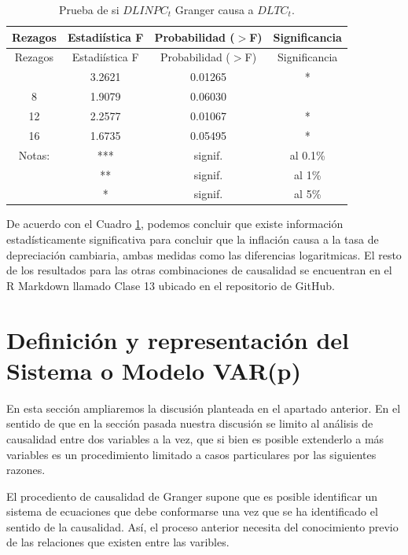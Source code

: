 \documentclass[
]{book}
\begin{document}
\begin{longtable}[]{@{}cccc@{}}
\caption{\label{tab:Granger} Prueba de si \(DLINPC_t\) Granger causa a \(DLTC_t\).}\tabularnewline
\toprule\noalign{}
Rezagos & Estadiística F & Probabilidad (\(>\)F) & Significancia \\
\midrule\noalign{}
\endfirsthead
\toprule\noalign{}
Rezagos & Estadiística F & Probabilidad (\(>\)F) & Significancia \\
\midrule\noalign{}
\endhead
\bottomrule\noalign{}
\endlastfoot
4 & 3.2621 & 0.01265 & * \\
8 & 1.9079 & 0.06030 & \\
12 & 2.2577 & 0.01067 & * \\
16 & 1.6735 & 0.05495 & * \\
Notas: & *** & signif. & al 0.1\% \\
& ** & signif. & al 1\% \\
& * & signif. & al 5\% \\
\end{longtable}

De acuerdo con el Cuadro \ref{tab:Granger}, podemos concluir que existe información estadísticamente significativa para concluir que la inflación causa a la tasa de depreciación cambiaria, ambas medidas como las diferencias logaritmicas. El resto de los resultados para las otras combinaciones de causalidad se encuentran en el R Markdown llamado Clase 13 ubicado en el repositorio de GitHub.

\hypertarget{definiciuxf3n-y-representaciuxf3n-del-sistema-o-modelo-varp}{%
\section{Definición y representación del Sistema o Modelo VAR(p)}\label{definiciuxf3n-y-representaciuxf3n-del-sistema-o-modelo-varp}}

En esta sección ampliaremos la discusión planteada en el apartado anterior. En el sentido de que en la sección pasada nuestra discusión se limito al análisis de causalidad entre dos variables a la vez, que si bien es posible extenderlo a más variables es un procedimiento limitado a casos particulares por las siguientes razones.

El procediento de causalidad de Granger supone que es posible identificar un sistema de ecuaciones que debe conformarse una vez que se ha identificado el sentido de la causalidad. Así, el proceso anterior necesita del conocimiento previo de las relaciones que existen entre las varibles.
\end{document}
